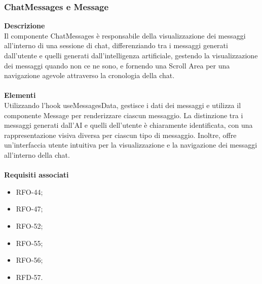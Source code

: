 \subsubsection{ChatMessages e Message}
\textbf{Descrizione}\\
Il componente ChatMessages è responsabile della visualizzazione dei messaggi all'interno di una sessione di chat, differenziando tra i messaggi generati dall'utente e quelli generati dall'intelligenza artificiale, gestendo la visualizzazione dei messaggi quando non ce ne sono, e fornendo una Scroll Area per una navigazione agevole attraverso la cronologia della chat.\\ \\
\textbf{Elementi}\\
Utilizzando l'hook useMessagesData, gestisce i dati dei messaggi e utilizza il componente Message per renderizzare ciascun messaggio. La distinzione tra i messaggi generati dall'AI e quelli dell'utente è chiaramente identificata, con una rappresentazione visiva diversa per ciascun tipo di messaggio. Inoltre, offre un'interfaccia utente intuitiva per la visualizzazione e la navigazione dei messaggi all'interno della chat.\\ \\
\textbf{Requisiti associati}
\begin{itemize}[itemsep=-4pt]
    \item RFO-44;
    \item RFO-47;
    \item RFO-52;
    \item RFO-55;
    \item RFO-56;
    \item RFD-57.
\end{itemize}

\newpage
